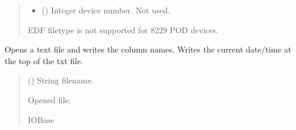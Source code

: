 \documentclass[letterpaper,10pt,english]{sphinxmanual}
\begin{document}
\begin{fulllineitems}
\begin{fulllineitems}
\begin{quote}
\begin{description}
\begin{itemize}
\item {} 
\sphinxAtStartPar
{} () \textendash{} Integer device number. Not used.

\end{itemize}

\sphinxAtStartPar
{} \textendash{} EDF filetype is not supported for 8229 POD devices.

\end{description}\end{quote}

\end{fulllineitems}


\begin{fulllineitems}
\label{\detokenize{Setup.SetupOneDevice:Setup.SetupOneDevice.Setup_8229.Setup8229._OpenSaveFile_TXT}}
\pysigstartsignatures
{}
\pysigstopsignatures
\sphinxAtStartPar
Opens a text file and writes the column names. Writes the current date/time         at the top of the txt file.
\begin{quote}\begin{description}
\sphinxAtStartPar
{} () \textendash{} String filename.

\sphinxAtStartPar
Opened file.

\sphinxAtStartPar
IOBase

\end{description}\end{quote}

\end{fulllineitems}



\end{fulllineitems}
\end{document}
